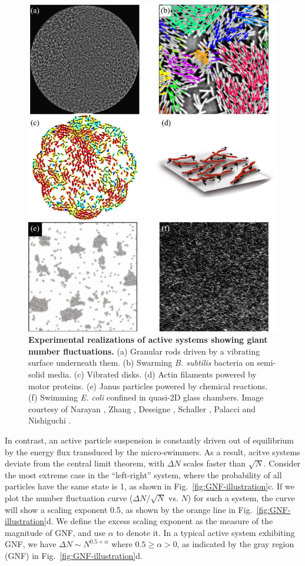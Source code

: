 \begin{figure}[htbp]
 \begin{center}
 \includegraphics[height=6 in]{Figs/1-Intro/GNF/GNF-experiments.pdf}
 \end{center}
 \caption[Experimental realizations of active systems showing giant number fluctuations]
 {
 \textbf{Experimental realizations of active systems showing giant number fluctuations.}
 (a) Granular rods driven by a vibrating surface underneath them.
 (b) Swarming \textit{B. subtilis} bacteria on semi-solid media.
 (c) Vibrated disks.
 (d) Actin filaments powered by motor proteins.
 (e) Janus particles powered by chemical reactions.
 (f) Swimming \textit{E. coli} confined in quasi-2D glass chambers.
 Image courtesy of Narayan \cite{Narayan2007}, Zhang \cite{Zhang2010}, Deseigne \cite{Deseigne2010}, Schaller \cite{Schaller2013}, Palacci \cite{Palacci2013} and Nishiguchi \cite{Nishiguchi2017}.
 }
 \label{fig:GNF-experiments}
\end{figure}

In contrast, an active particle suspension is constantly driven out of equilibrium by the energy flux transduced by the micro-swimmers.
As a result, acitve systems deviate from the central limit theorem, with $\Delta N$ scales faster than $\sqrt N$.
Consider the most extreme case in the ``left-right'' system, where the probability of all particles have the same state is 1, as shown in Fig.~\ref{fig:GNF-illustration}c.
If we plot the number fluctuation curve ($\Delta N/\sqrt N$ vs. $N$) for such a system, the curve will show a scaling exponent 0.5, as shown by the orange line in Fig.~\ref{fig:GNF-illustration}d.
We define the excess scaling exponent as the measure of the magnitude of GNF, and use $\alpha$ to denote it.
In a typical active system exhibiting GNF, we have $\Delta N \sim N^{0.5+\alpha}$ where $0.5\ge\alpha>0$, as indicated by the gray region (GNF) in Fig.~\ref{fig:GNF-illustration}d.


